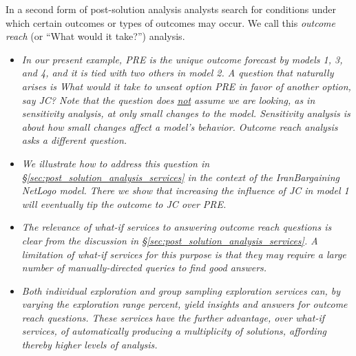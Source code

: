 

In a second form of post-solution analysis analysts search for conditions under which certain outcomes or types of outcomes may occur. We call this \emph{outcome reach} (or ``What would it take?'') analysis. 

\begin{itemize}
\item {\it In our present example, PRE is the unique outcome forecast by models 1, 3, and 4, and it is tied with two others in model 2. A question that naturally arises is What would it take to unseat option PRE in favor of  another option, say JC? Note that the question does \underline{not} assume we are looking, as in sensitivity analysis, at only small changes to the model.  Sensitivity analysis is about how small changes affect a model's behavior. Outcome reach analysis asks a different question.}
\item {\it We illustrate how to address this question in \S\ref{sec:post_solution_analysis_services} in the context of the IranBargaining NetLogo model. There we show that increasing the influence of JC in model 1 will eventually tip the outcome to JC over PRE.}
\item {\it The relevance of what-if services to answering outcome reach questions is clear from the discussion in \S\ref{sec:post_solution_analysis_services}. A limitation of what-if services for this purpose is that they may require a large number of manually-directed queries to find good answers.}
\item {\it Both individual exploration and group sampling exploration services can, by varying the exploration range percent, yield insights and answers for outcome reach questions. These services have the further advantage, over what-if services, of automatically producing a multiplicity of solutions, affording thereby higher levels of analysis.}
\end{itemize}


